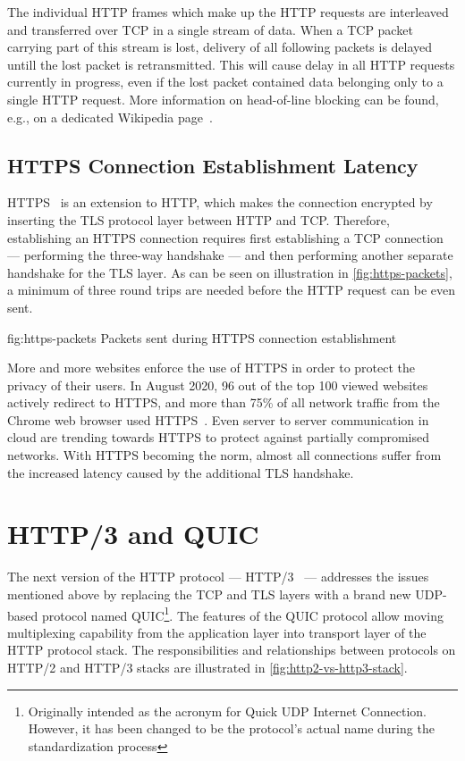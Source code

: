 The individual HTTP frames which make up the HTTP requests are interleaved and transferred over TCP
in a single stream of data. When a TCP packet carrying part of this stream is lost, delivery of all
following packets is delayed untill the lost packet is retransmitted. This will cause delay in all
HTTP requests currently in progress, even if the lost packet contained data belonging only to a
single HTTP request. More information on head-of-line blocking can be found, e.g., on a dedicated
Wikipedia page~\cite{wiki:head-of-line-blocking}.

\subsection*{HTTPS Connection Establishment Latency}

HTTPS~\cite{rfc2818} is an extension to HTTP, which makes the connection encrypted by inserting the
TLS protocol layer between HTTP and TCP. Therefore, establishing an HTTPS connection requires first
establishing a TCP connection --- performing the three-way handshake --- and then performing another
separate handshake for the TLS layer. As can be seen on illustration in \autoref{fig:https-packets},
a minimum of three round trips are needed before the HTTP request can be even sent.

\begin{myFigure}
  {fig:https-packets}
  {Packets sent during HTTPS connection establishment}

  \resizebox{0.8\linewidth}{!}{}

\end{myFigure}

More and more websites enforce the use of HTTPS in order to protect the privacy of their users. In
August 2020, 96 out of the top 100 viewed websites actively redirect to HTTPS, and more than 75\% of
all network traffic from the Chrome web browser used HTTPS~\cite{googleTransparency}. Even server to
server communication in cloud are trending towards HTTPS to protect against partially compromised
networks. With HTTPS becoming the norm, almost all connections suffer from the increased latency
caused by the additional TLS handshake.

\section{HTTP/3 and QUIC}

The next version of the HTTP protocol --- HTTP/3~\cite{draft-ietf-quic-http} --- addresses the issues
mentioned above by replacing the TCP and TLS layers with a brand new UDP-based protocol named
QUIC\footnote{Originally intended as the acronym for Quick UDP Internet Connection. However, it has
  been changed to be the protocol's actual name during the standardization process}. The features of
the QUIC protocol allow moving multiplexing capability from the application layer into transport
layer of the HTTP protocol stack. The responsibilities and relationships between protocols on HTTP/2
and HTTP/3 stacks are illustrated in \autoref{fig:http2-vs-http3-stack}.

